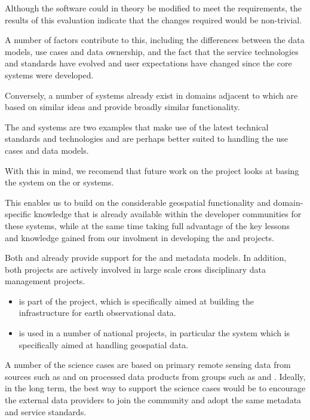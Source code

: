 \documentclass{article}
\begin{document}
Although the \cite{astro} software could in theory be modified to meet
the \cite{trop} requirements, the results of this evaluation indicate
that the changes required would be non-trivial.

A number of factors contribute to this, including the differences
between the data models, use cases and data ownership, and the fact
that the service technologies and standards have evolved and user
expectations have changed since the core \cite{astro}
systems were developed.

Conversely, a number of systems already exist in domains adjacent to
\cite{trop} which are based on similar ideas and provide broadly
similar functionality.

The \cite{metacat} and \cite{ckan} systems are two examples that make
use of the latest technical standards and technologies and are perhaps
better suited to handling the \cite{trop} use cases and data models.

With this in mind, we recomend that future work on the \cite{trop}
project looks at basing the \cite{trop} system on the \cite{metacat}
or \cite{ckan} systems.

This enables us to build on the considerable geospatial functionality and
domain-specific knowledge that is already available within the developer
communities for these systems,
while at the same time taking full advantage of the key lessons and
knowledge gained from our involment in developing the \cite{astro} and
\cite{ivoa} \cite{vo} projects.

Both \cite{metacat} and \cite{ckan} already provide support for the \cite{gis}
and \cite{eml} metadata models. In addition, both projects are actively
involved in large scale cross disciplinary data management projects.

\begin{itemize}
    \item \cite{metacat} is part of the \cite{data-one} project, which is
    specifically aimed at building the infrastructure for earth observational
    data.
    \item \cite{ckan} is used in a number of national \cite{data-gov}
    projects, in particular the \cite{fgdc} \cite{fgdc-geo} system which
    is specifically aimed at handling geospatial data.
\end{itemize}

A number of the \cite{trop} science cases are based on primary remote
sensing data from sources such as \cite{landsat} and on processed data
products from groups such as \cite{nasa-jpl-carbon} and \cite{whrc}.
Ideally, in the long term, the best way to support the \cite{trop}
science cases would be to encourage the external data providers to join
the \cite{trop} community and adopt the same metadata and service standards.
\end{document}
